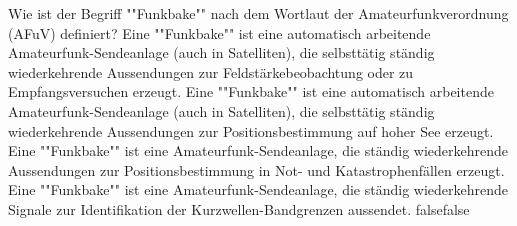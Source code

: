     {Wie ist der Begriff ""Funkbake"" nach dem Wortlaut der Amateurfunkverordnung (AFuV) definiert?}
    {Eine ""Funkbake"" ist eine automatisch arbeitende Amateurfunk-Sendeanlage (auch in Satelliten), die selbsttätig ständig wiederkehrende Aussendungen zur Feldstärkebeobachtung oder zu Empfangsversuchen erzeugt.}
    {Eine ""Funkbake"" ist eine automatisch arbeitende Amateurfunk-Sendeanlage (auch in Satelliten), die selbsttätig ständig wiederkehrende Aussendungen zur Positionsbestimmung auf hoher See erzeugt.}
    {Eine ""Funkbake"" ist eine  Amateurfunk-Sendeanlage, die ständig wiederkehrende Aussendungen zur Positionsbestimmung in Not- und Katastrophenfällen erzeugt.}
    {Eine ""Funkbake"" ist eine  Amateurfunk-Sendeanlage, die ständig wiederkehrende Signale zur Identifikation der Kurzwellen-Bandgrenzen aussendet.}
    {false}{false}
